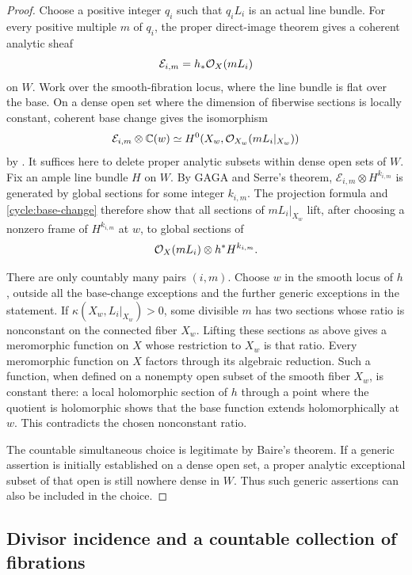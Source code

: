 \begin{proof}
Choose a positive integer $q_i$ such that $q_iL_i$ is an actual line
bundle.  For every positive multiple $m$ of $q_i$, the proper direct-image
theorem gives a coherent analytic sheaf
\[
                         \mathcal E_{i,m}=h_*\mathcal O_X(mL_i)
\]
on $W$.  Work over the smooth-fibration locus, where the line bundle
is flat over the base.  On a dense open set where the dimension of
fiberwise sections is locally constant, coherent base change gives
the isomorphism
\begin{equation}\label{cycle:base-change}
 \mathcal E_{i,m}\otimes\mathbb C(w)
       \simeq H^0(X_w,\mathcal O_{X_w}(mL_i|_{X_w}))
\end{equation}
by \cite[Section~7, Satz~5]{Grauert}.  It suffices here
to delete proper analytic subsets within dense open sets of $W$.
Fix an ample line bundle $H$ on $W$.  By GAGA and Serre's theorem,
$\mathcal E_{i,m}\otimes H^{k_{i,m}}$ is generated by global sections for
some integer $k_{i,m}$.  The projection formula and
\eqref{cycle:base-change} therefore show that all sections of
$mL_i|_{X_w}$ lift, after choosing a nonzero frame of $H^{k_{i,m}}$ at
$w$, to global sections of
\[
                    \mathcal O_X(mL_i)\otimes h^*H^{k_{i,m}}.
\]

There are only countably many pairs $(i,m)$.  Choose $w$ in the smooth
locus of $h$, outside all the base-change exceptions and the further
generic exceptions in the statement.  If
$\kappa(X_w,L_i|_{X_w})>0$, some divisible $m$ has two sections whose
ratio is nonconstant on the connected fiber $X_w$.  Lifting these
sections as above gives a meromorphic function on $X$ whose restriction
to $X_w$ is that ratio.  Every meromorphic function on $X$ factors
through its algebraic reduction.  Such a function, when defined on a
nonempty open subset of the smooth fiber $X_w$, is constant there:
a local holomorphic section of $h$ through a point where the quotient
is holomorphic shows that the base function extends holomorphically
at $w$.  This contradicts the chosen nonconstant ratio.

The countable simultaneous choice is legitimate by Baire's theorem.
If a generic assertion is initially established on a dense open set,
a proper analytic exceptional subset of that open is still nowhere
dense in $W$.  Thus such generic assertions can also be included in the
choice.
\end{proof}

\subsection{Divisor incidence and a countable collection of fibrations}

